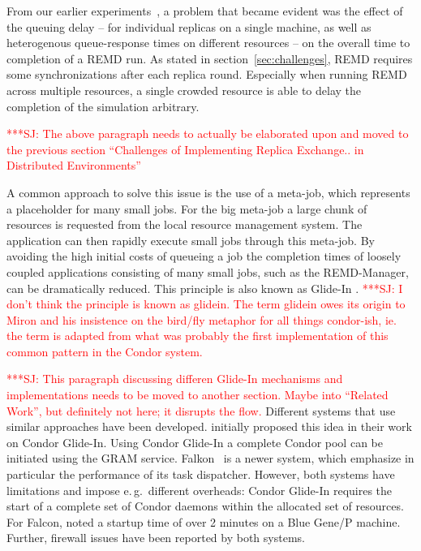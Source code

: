 \documentclass{rspublic}
\newcommand{\jhanote}[1]{ {\textcolor{red} { ***SJ: #1 }}}
\newcommand{\jhanote}[1]{}
\newcommand{\glidein}[1]{Glide-In }
\begin{document}
From our earlier experiments~\citep{Luckow:2008la}, a problem that
became evident was the effect of the queuing delay -- for individual
replicas on a single machine, as well as heterogenous queue-response
times on different resources -- on the overall time to completion of a
REMD run.  As stated in section~\ref{sec:challenges}, REMD requires
some synchronizations after each replica round. Especially when
running REMD across multiple resources, a single crowded resource is
able to delay the completion of the simulation arbitrary.

\jhanote{The above paragraph needs to actually be elaborated upon and
  moved to the previous section ``Challenges of Implementing Replica
  Exchange.. in Distributed Environments''}

A common approach to solve this issue is the use of a meta-job, which
represents a placeholder for many small jobs. For the big meta-job a
large chunk of resources is requested from the local resource
management system. The application can then rapidly execute small jobs
through this meta-job. By avoiding the high initial costs of queueing
a job the completion times of loosely coupled applications consisting
of many small jobs, such as the REMD-Manager, can be dramatically
reduced.  This principle is also known as \glidein\ .  \jhanote{I
  don't think the principle is known as glidein. The term glidein owes
  its origin to Miron and his insistence on the bird/fly metaphor for
  all things condor-ish, ie. the term is adapted from what was
  probably the first implementation of this common pattern in the
  Condor system.}

\jhanote{This paragraph discussing differen Glide-In mechanisms and
  implementations needs to be moved to another section. Maybe into
  ``Related Work'', but definitely not here; it disrupts the flow.}
Different systems that use similar approaches have been
developed. \citet{citeulike:291860} initially proposed this idea in
their work on Condor Glide-In. Using Condor Glide-In a complete Condor
pool can be initiated using the GRAM service. Falkon~\citet{1362680}
is a newer system, which emphasize in particular the performance of
its task dispatcher.  However, both systems have limitations and
impose e.\,g.\ different overheads: Condor \glidein\ requires the
start of a complete set of Condor daemons within the allocated set of
resources. For Falcon, \citet{citeulike:3169002} noted a startup time
of over 2 minutes on a Blue Gene/P machine. Further, firewall issues
have been reported by both systems.
  
\end{document}

